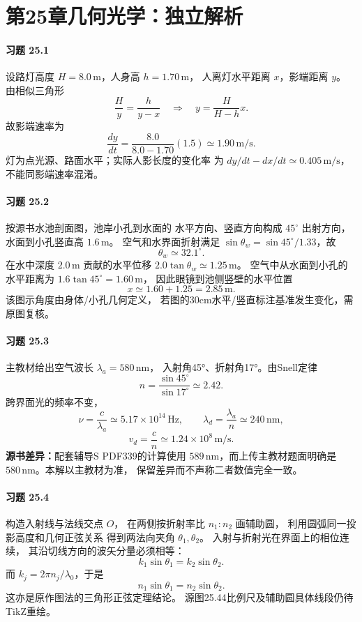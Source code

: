\section*{第25章\quad 几何光学：独立解析}
\paragraph{习题 25.1}
设路灯高度 \(H=8.0\,\mathrm m\)，人身高 \(h=1.70\,\mathrm m\)，
人离灯水平距离 \(x\)，影端距离 \(y\)。
由相似三角形
\[
\frac H y=\frac h{y-x}
\quad\Longrightarrow\quad y=\frac H{H-h}x.
\]
故影端速率为
\[
\boxed{\frac{dy}{dt}
=\frac{8.0}{8.0-1.70}(1.5)
\simeq1.90\,\mathrm{m/s}}.
\]
灯为点光源、路面水平；实际人影长度的变化率
为 \(dy/dt-dx/dt\simeq0.405\,\mathrm{m/s}\)，
不能同影端速率混淆。

\paragraph{习题 25.2}
按源书水池剖面图，池岸小孔到水面的
水平方向、竖直方向构成 \(45^\circ\) 出射方向，
水面到小孔竖直高 \(1.6\,\mathrm m\)。
空气和水界面折射满足
\(\sin\theta_w=\sin45^\circ/1.33\)，故
\[
\boxed{\theta_w\simeq32.1^\circ}.
\]
在水中深度 \(2.0\,\mathrm m\) 贡献的水平位移
\(2.0\tan\theta_w\simeq1.25\,\mathrm m\)。
空气中从水面到小孔的水平距离为
\(1.6\tan45^\circ=1.60\,\mathrm m\)，
因此眼镜到池侧竖壁的水平位置
\[
\boxed{x\simeq1.60+1.25=2.85\,\mathrm m}.
\]
该图示角度由身体/小孔几何定义，
若图的30cm水平/竖直标注基准发生变化，需原图复核。

\paragraph{习题 25.3}
主教材给出空气波长 \(\lambda_a=580\,\mathrm{nm}\)，
入射角45°、折射角17°。由Snell定律
\[
\boxed{n=\frac{\sin45^\circ}{\sin17^\circ}\simeq2.42}.
\]
跨界面光的频率不变，
\[
\boxed{\nu=\frac c{\lambda_a}
\simeq5.17\times10^{14}\,\mathrm{Hz}},\qquad
\boxed{\lambda_d=\frac{\lambda_a}{n}\simeq240\,\mathrm{nm}},
\]
\[
\boxed{v_d=\frac cn\simeq1.24\times10^8\,\mathrm{m/s}}.
\]
\textbf{源书差异：}配套辅导S PDF339的计算使用
\(589\,\mathrm{nm}\)，而上传主教材题面明确是
\(580\,\mathrm{nm}\)。本解以主教材为准，
保留差异而不声称二者数值完全一致。

\paragraph{习题 25.4}
构造入射线与法线交点 \(O\)，
在两侧按折射率比 \(n_1:n_2\) 画辅助圆，
利用圆弧同一投影高度和几何正弦关系
得到两法向夹角 \(\theta_1,\theta_2\)。
入射与折射光在界面上的相位连续，
其沿切线方向的波矢分量必须相等：
\[
k_1\sin\theta_1=k_2\sin\theta_2.
\]
而 \(k_j=2\pi n_j/\lambda_0\)，于是
\[
\boxed{n_1\sin\theta_1=n_2\sin\theta_2}.
\]
这亦是原作图法的三角形正弦定理结论。
源图25.44比例尺及辅助圆具体线段仍待TikZ重绘。

